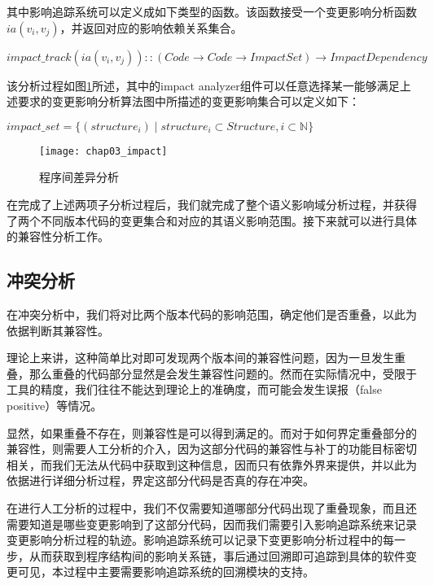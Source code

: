 其中影响追踪系统可以定义成如下类型的函数。该函数接受一个变更影响分析函数$ia(v_i,v_j)$，并返回对应的影响依赖关系集合。

\begin{definition}
	$impact\_track(ia(v_i,v_j))::(Code \rightarrow Code \rightarrow Impact Set) \rightarrow Impact Dependency$
\end{definition}


该分析过程如图\ref {impact_analyzer}所述，其中的impact analyzer组件可以任意选择某一能够满足上述要求的变更影响分析算法图中所描述的变更影响集合可以定义如下：
\begin{definition}
	$impact\_set = \{ (structure_i) \mid  structure_i \subset Structure, i \subset \mathbb{N}\}$
\end{definition}

\begin{figure}[H]
	\centering
	\texttt{[image: chap03\_impact]}
	\caption {程序间差异分析}
	\label {impact_analyzer}	
\end{figure}

在完成了上述两项子分析过程后，我们就完成了整个语义影响域分析过程，并获得了两个不同版本代码的变更集合和对应的其语义影响范围。接下来就可以进行具体的兼容性分析工作。

\subsection{冲突分析}

在冲突分析中，我们将对比两个版本代码的影响范围，确定他们是否重叠，以此为依据判断其兼容性。

理论上来讲，这种简单比对即可发现两个版本间的兼容性问题，因为一旦发生重叠，那么重叠的代码部分显然是会发生兼容性问题的。然而在实际情况中，受限于工具的精度，我们往往不能达到理论上的准确度，而可能会发生误报（false positive）等情况。

显然，如果重叠不存在，则兼容性是可以得到满足的。而对于如何界定重叠部分的兼容性，则需要人工分析的介入，因为这部分代码的兼容性与补丁的功能目标密切相关，而我们无法从代码中获取到这种信息，因而只有依靠外界来提供，并以此为依据进行详细分析过程，界定这部分代码是否真的存在冲突。

在进行人工分析的过程中，我们不仅需要知道哪部分代码出现了重叠现象，而且还需要知道是哪些变更影响到了这部分代码，因而我们需要引入影响追踪系统来记录变更影响分析过程的轨迹。影响追踪系统可以记录下变更影响分析过程中的每一步，从而获取到程序结构间的影响关系链，事后通过回溯即可追踪到具体的软件变更可见，本过程中主要需要影响追踪系统的回溯模块的支持。

